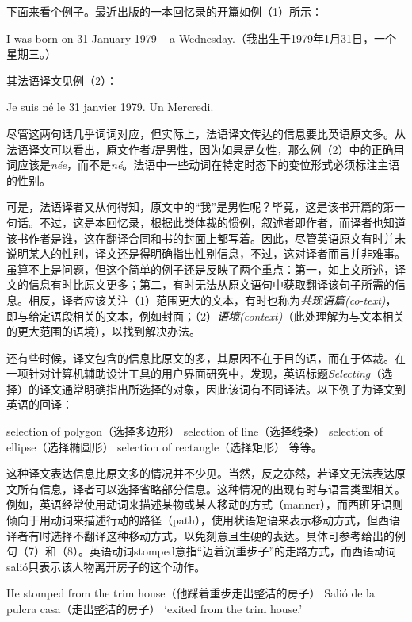 \documentclass[output=paper]{langscibook}
\begin{document}
下面来看个例子。最近出版的一本回忆录\citep{Tammet2006}的开篇如例（1）所示：

\ea
I was born on 31 January 1979 – a Wednesday.（我出生于1979年1月31日，一个星期三。）
\z

其法语译文\citep{Tammet2009}见例（2）：

\ea
Je suis né le 31 janvier 1979. Un Mercredi.
\z

尽管这两句话几乎词词对应，但实际上，法语译文传达的信息要比英语原文多。从法语译文可以看出，原文作者\textit{I}是男性，因为如果是女性，那么例（2）中的正确用词应该是\textit{née}，而不是\textit{né}。法语中一些动词在特定时态下的变位形式必须标注主语的性别。

可是，法语译者又从何得知，原文中的“我”是男性呢？毕竟，这是该书开篇的第一句话。不过，这是本回忆录，根据此类体裁的惯例，叙述者即作者，而译者也知道该书作者是谁，这在翻译合同和书的封面上都写着。因此，尽管英语原文有时并未说明某人的性别，译文还是得明确指出性别信息，不过，这对译者而言并非难事。虽算不上是问题，但这个简单的例子还是反映了两个重点：第一，如上文所述，译文的信息有时比原文更多；第二，有时无法从原文语句中获取翻译该句子所需的信息。相反，译者应该关注（1）范围更大的文本，有时也称为\emph{共现语篇(co-text)}，即与给定语段相关的文本，例如封面；（2）\textit{语境(context)}（此处理解为与文本相关的更大范围的语境），以找到解决办法。

还有些时候，译文包含的信息比原文的多，其原因不在于目的语，而在于体裁。在一项针对计算机辅助设计工具的用户界面研究中，\citet{Moorkens2012}发现，英语标题\textit{Selecting}（选择）的译文通常明确指出所选择的对象，因此该词有不同译法。以下例子为译文到英语的回译：

\ea selection of polygon（选择多边形）
\ex selection of line（选择线条）
\ex selection of ellipse（选择椭圆形）
\ex selection of rectangle（选择矩形）
\z
等等。

这种译文表达信息比原文多的情况并不少见。当然，反之亦然，若译文无法表达原文所有信息，译者可以选择省略部分信息。这种情况的出现有时与语言类型相关。例如，英语经常使用动词来描述某物或某人移动的方式（manner），而西班牙语则倾向于用动词来描述行动的路径（path），使用状语短语来表示移动方式，但西语译者有时选择不翻译这种移动方式，以免刻意且生硬的表达。具体可参考\citet{Slobin2003}给出的例句（7）和（8）。英语动词stomped意指“迈着沉重步子”的走路方式，而西语动词salió只表示该人物离开房子的这个动作。

\ea He stomped from the trim house（他踩着重步走出整洁的房子）
\ex Salió de la pulcra casa（走出整洁的房子）
\glt `exited from the trim house.'
\z
\end{document}
